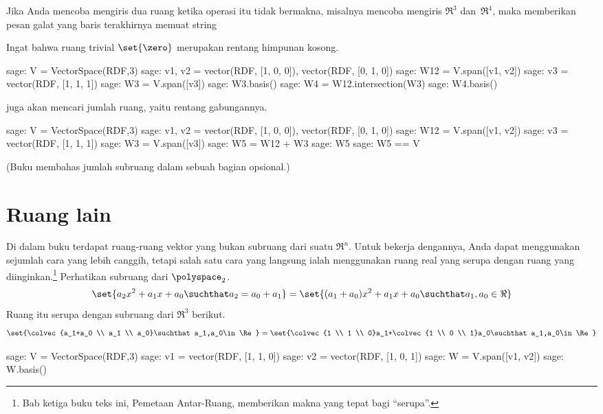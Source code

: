 Jika Anda mencoba mengiris dua ruang ketika operasi itu tidak bermakna,
misalnya mencoba mengiris $\Re^3$ dan~$\Re^4$, maka \Sage{}
memberikan pesan galat yang baris terakhirnya memuat string

Ingat bahwa ruang trivial $\set{\zero}$ merupakan rentang himpunan kosong.
\begin{sagecommandline}
sage: V = VectorSpace(RDF,3)
sage: v1, v2 = vector(RDF, [1, 0, 0]), vector(RDF, [0, 1, 0])
sage: W12 = V.span([v1, v2])
sage: v3 = vector(RDF, [1, 1, 1])
sage: W3 = V.span([v3])
sage: W3.basis()
sage: W4 = W12.intersection(W3)
sage: W4.basis()
\end{sagecommandline}

\Sage{} juga akan mencari jumlah ruang, yaitu rentang gabungannya.
\begin{sagecommandline}
sage: V = VectorSpace(RDF,3)
sage: v1, v2 = vector(RDF, [1, 0, 0]), vector(RDF, [0, 1, 0])
sage: W12 = V.span([v1, v2])
sage: v3 = vector(RDF, [1, 1, 1])
sage: W3 = V.span([v3])
sage: W5 = W12 + W3
sage: W5
sage: W5 == V
\end{sagecommandline}
(Buku membahas jumlah subruang dalam sebuah bagian opsional.)





\section{Ruang lain}

Di dalam buku terdapat ruang-ruang vektor yang bukan subruang dari suatu $\Re^n$.
Untuk bekerja dengannya, Anda dapat menggunakan sejumlah cara yang lebih canggih, tetapi
salah satu cara yang langsung ialah 
menggunakan ruang real yang serupa dengan ruang yang diinginkan.\footnote{%
  Bab ketiga buku teks ini, 
  Pemetaan Antar-Ruang, memberikan makna yang tepat bagi 
  ``serupa''.}
Perhatikan subruang dari 
$\polyspace_2$.
\begin{equation*}
  \set{ a_2x^2+a_1x+a_0\suchthat a_2=a_0+a_1}           
   =\set{ (a_1+a_0)x^2+a_1x+a_0 \suchthat a_1,a_0\in\Re}
\end{equation*}
Ruang itu serupa dengan
subruang dari $\Re^3$ berikut.
\begin{equation*}
  \set{\colvec{a_1+a_0 \\ a_1 \\ a_0}\suchthat a_1,a_0\in\Re}
  =\set{\colvec{1 \\ 1 \\ 0}a_1+\colvec{1 \\ 0 \\ 1}a_0\suchthat a_1,a_0\in\Re}
\end{equation*}
\begin{sagecommandline}
sage: V = VectorSpace(RDF,3)
sage: v1 = vector(RDF, [1, 1, 0])
sage: v2 = vector(RDF, [1, 0, 1])
sage: W = V.span([v1, v2])
sage: W.basis()
\end{sagecommandline}

